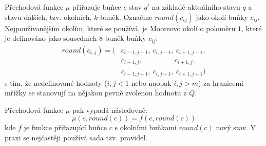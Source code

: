 \documentclass[a4paper,10pt]{article}
\begin{document}
Přechodová funkce $\mu$ přiřazuje buňce $c$ stav $q'$ na základě aktuálního stavu $q$ a stavu dalších, tzv. okolních, $k$ buněk. Označme $round(c_{ij})$ jako okolí buňky $c_{ij}$. Nejpoužívanějším okolím, které se používá, je Mooreovo okolí o poloměru $1$, které je definováno jako sousedních $8$ buněk buňky $c_{ij}$:
\begin{align*}
 round(c_{i,j}) = (
  & c_{i-1, j-1},\ 	c_{i, j-1},\ 	c_{i+1, j-1},	\\
  & c_{i-1, j  },\ 	\qquad \qquad\ 	c_{i+1, j  },	\\
  & c_{i-1, j+1},\ 	c_{i, j+1},\ 	c_{i+1, j+1}	
 )
\end{align*}
s tím, že nedefinované hodnoty ($i,j < 1$ nebo naopak $i,j > m$) za hranicemi mřížky se stanovují na nějakou pevně zvolenou hodnotu z $Q$.

Přechodová funkce $\mu$ pak vypadá následovně:
$$
\mu(c, round(c)) = f(c, round(c))
$$
kde $f$ je funkce přiřazující buňce $c$ s okolními buňkami $round(c)$ nový stav. V praxi se nejčastěji používá sada tzv.  pravidel.
\end{document}
